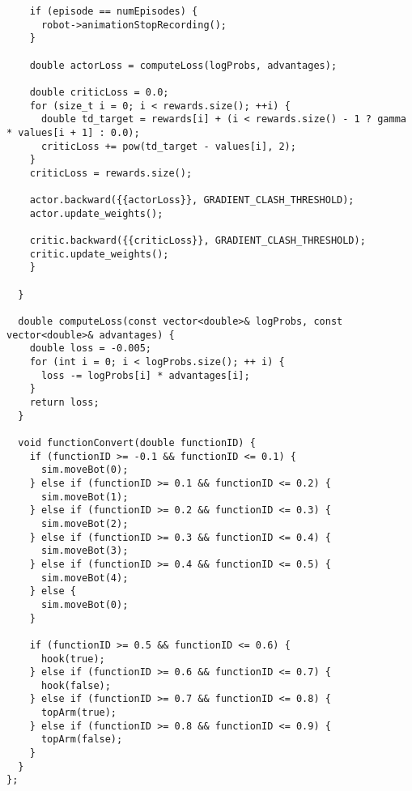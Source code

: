 \begin{verbatim}
    if (episode == numEpisodes) {
      robot->animationStopRecording();
    }
 
    double actorLoss = computeLoss(logProbs, advantages);
 
    double criticLoss = 0.0;
    for (size_t i = 0; i < rewards.size(); ++i) {
      double td_target = rewards[i] + (i < rewards.size() - 1 ? gamma * values[i + 1] : 0.0);
      criticLoss += pow(td_target - values[i], 2);
    }
    criticLoss = rewards.size();
 
    actor.backward({{actorLoss}}, GRADIENT_CLASH_THRESHOLD);
    actor.update_weights();
 
    critic.backward({{criticLoss}}, GRADIENT_CLASH_THRESHOLD);
    critic.update_weights();
    }
 
  }
 
  double computeLoss(const vector<double>& logProbs, const vector<double>& advantages) {
    double loss = -0.005;
    for (int i = 0; i < logProbs.size(); ++ i) {
      loss -= logProbs[i] * advantages[i];
    }
    return loss;
  }
 
  void functionConvert(double functionID) {
    if (functionID >= -0.1 && functionID <= 0.1) {
      sim.moveBot(0);
    } else if (functionID >= 0.1 && functionID <= 0.2) {
      sim.moveBot(1);
    } else if (functionID >= 0.2 && functionID <= 0.3) {
      sim.moveBot(2);
    } else if (functionID >= 0.3 && functionID <= 0.4) {
      sim.moveBot(3);
    } else if (functionID >= 0.4 && functionID <= 0.5) {
      sim.moveBot(4);
    } else {
      sim.moveBot(0);
    }
 
    if (functionID >= 0.5 && functionID <= 0.6) {
      hook(true);
    } else if (functionID >= 0.6 && functionID <= 0.7) {
      hook(false);
    } else if (functionID >= 0.7 && functionID <= 0.8) {
      topArm(true);
    } else if (functionID >= 0.8 && functionID <= 0.9) {
      topArm(false);
    }
  }
};
\end{verbatim}
